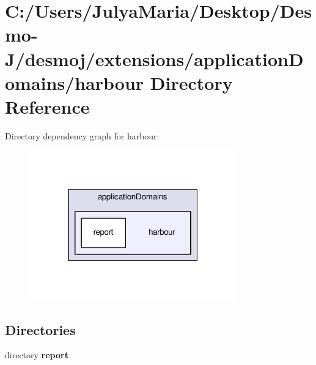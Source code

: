 \section{C\-:/\-Users/\-Julya\-Maria/\-Desktop/\-Desmo-\/\-J/desmoj/extensions/application\-Domains/harbour Directory Reference}
\label{dir_1fbea8f25cd3df91ea507f8b87d27511}
Directory dependency graph for harbour\-:
\nopagebreak
\begin{figure}[H]
\begin{center}
\leavevmode
\includegraphics[width=254pt]{dir_1fbea8f25cd3df91ea507f8b87d27511_dep}
\end{center}
\end{figure}
\subsection*{Directories}
\begin{DoxyCompactItemize}
\item 
directory {\bf report}
\end{DoxyCompactItemize}
